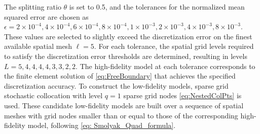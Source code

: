 The splitting ratio $\theta$ is set to 0.5, and the tolerances for the normalized mean squared error are chosen as $\epsilon=2\times 10^{-4}, 4\times 10^{-4}, 6\times 10^{-4}, 8\times 10^{-4}, 1\times 10^{-3}, 2\times 10^{-3}, 4\times 10^{-3}, 8\times 10^{-3}$. These values are selected to slightly exceed the discretization error on the finest available spatial mesh $\ell=5$. For each tolerance, the spatial grid levels required to satisfy the discretization error thresholds are determined, resulting in levels  $L=5,4,4,4,4,3,3,2,2$. The high-fidelity model at each tolerance corresponds to the finite element solution of \eqref{eq:FreeBoundary} that achieves the specified discretization accuracy. To construct the low-fidelity models, sparse grid stochastic collocation with level $q=1$ sparse grid nodes \eqref{eq:NestedColPts} is used. These candidate low-fidelity models are built over a sequence of spatial meshes with grid nodes smaller than or equal to those of the corresponding high-fidelity model, following \eqref{eq: Smolyak_Quad_formula}.

